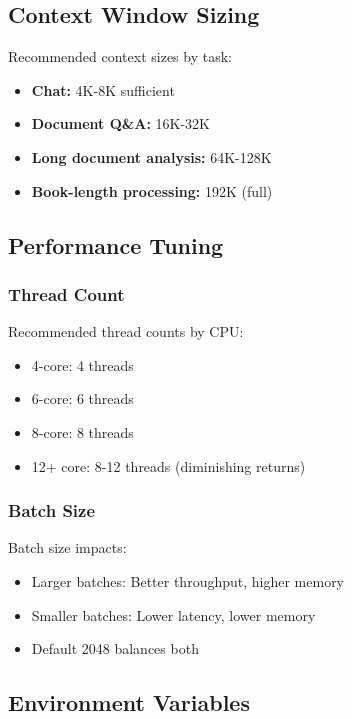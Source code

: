 \subsection{Context Window Sizing}

Recommended context sizes by task:

\begin{itemize}
    \item \textbf{Chat:} 4K-8K sufficient
    \item \textbf{Document Q\&A:} 16K-32K
    \item \textbf{Long document analysis:} 64K-128K
    \item \textbf{Book-length processing:} 192K (full)
\end{itemize}

\subsection{Performance Tuning}

\subsubsection{Thread Count}

Recommended thread counts by CPU:

\begin{itemize}
    \item 4-core: 4 threads
    \item 6-core: 6 threads
    \item 8-core: 8 threads
    \item 12+ core: 8-12 threads (diminishing returns)
\end{itemize}

\subsubsection{Batch Size}

Batch size impacts:

\begin{itemize}
    \item Larger batches: Better throughput, higher memory
    \item Smaller batches: Lower latency, lower memory
    \item Default 2048 balances both
\end{itemize}

\subsection{Environment Variables}

